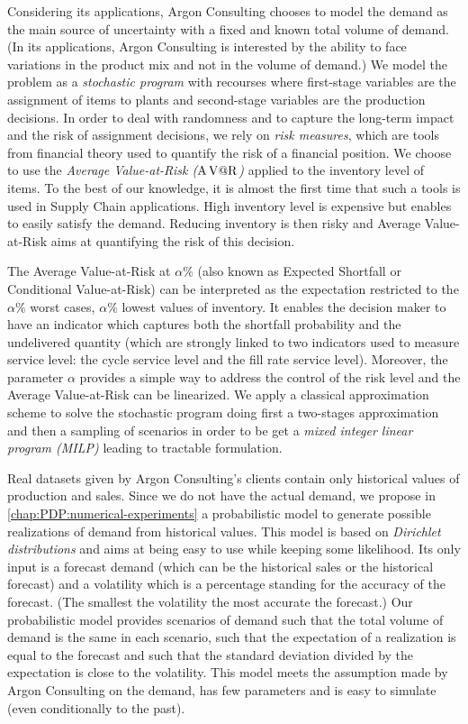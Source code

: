 Considering its applications, Argon Consulting chooses to model the demand as the main source of uncertainty with a fixed and known total volume of demand.
(In its applications, Argon Consulting is interested by the ability to face variations in the product mix and not in the volume of demand.)
We model the problem as a \emph{stochastic program} with recourses where first-stage variables are the assignment of items to plants and second-stage variables are the production decisions.
In order to deal with randomness and to capture the long-term impact and the risk of assignment decisions, we rely on \emph{risk measures}, which are tools from financial theory used to quantify the risk of a financial position.
We choose to use the \emph{Average Value-at-Risk ($\operatorname{A\operatorname{V@R}}$)} applied to the inventory level of items.
To the best of our knowledge, it is almost the first time that such a tools is used in Supply Chain applications.
High inventory level is expensive but enables to easily satisfy the demand.
Reducing inventory is then risky and Average Value-at-Risk aims at quantifying the risk of this decision.


The Average Value-at-Risk at $\alpha\%$ (also known as Expected Shortfall or Conditional Value-at-Risk) can be interpreted as the expectation restricted to the $\alpha\%$ worst cases, \ie $\alpha\%$ lowest values of inventory.
It enables the decision maker to have an indicator which captures both the shortfall probability and the undelivered quantity (which are strongly linked to two indicators used to measure service level: the cycle service level and the fill rate service level).
Moreover, the parameter $\alpha$ provides a simple way to address the control of the risk level and the Average Value-at-Risk can be linearized.
We apply a classical approximation scheme to solve the stochastic program doing first a two-stages approximation and then a sampling of scenarios in order to be get a \emph{mixed integer linear program (MILP)} leading to tractable formulation.


\medskip


Real datasets given by Argon Consulting's clients contain only historical values of production and sales.
Since we do not have the actual demand, we propose in \cref{chap:PDP:numerical-experiments} a probabilistic model to generate possible realizations of demand from historical values.
This model is based on \emph{Dirichlet distributions} and aims at being easy to use while keeping some likelihood.
Its only input is a forecast demand (which can be the historical sales or the historical forecast) and a volatility which is a percentage standing for the accuracy of the forecast.
(The smallest the volatility the most accurate the forecast.)
Our probabilistic model provides scenarios of demand such that the total volume of demand is the same in each scenario, such that the expectation of a realization is equal to the forecast and such that the standard deviation divided by the expectation is close to the volatility.
This model meets the assumption made by Argon Consulting on the demand, has few parameters and is easy to simulate (even conditionally to the past).


